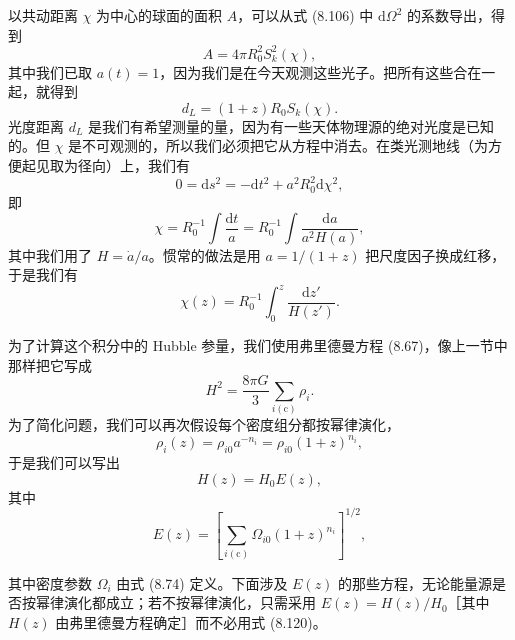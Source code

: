 以共动距离 $\chi$ 为中心的球面的面积 $A$，可以从式 (8.106) 中 $\mathrm{d}\Omega^{2}$ 的系数导出，得到
\begin{equation*}
A = 4\pi R_0^{2}S_k^{2}(\chi),
\tag{8.112}
\end{equation*}
其中我们已取 $a(t)=1$，因为我们是在今天观测这些光子。把所有这些合在一起，就得到
\begin{equation*}
d_L = (1+z)R_0S_k(\chi).
\tag{8.113}
\end{equation*}
光度距离 $d_L$ 是我们有希望测量的量，因为有一些天体物理源的绝对光度是已知的。但 $\chi$ 是不可观测的，所以我们必须把它从方程中消去。在类光测地线（为方便起见取为径向）上，我们有
\begin{equation*}
0 = \mathrm{d}s^{2} = -\mathrm{d}t^{2} + a^{2}R_0^{2}\mathrm{d}\chi^{2},
\tag{8.114}
\end{equation*}
即
\begin{equation*}
\chi = R_0^{-1}\int\frac{\mathrm{d}t}{a} = R_0^{-1}\int\frac{\mathrm{d}a}{a^{2}H(a)},
\tag{8.115}
\end{equation*}
其中我们用了 $H=\dot{a}/a$。惯常的做法是用 $a=1/(1+z)$ 把尺度因子换成红移，于是我们有
\begin{equation*}
\chi(z) = R_0^{-1}\int_{0}^{z}\frac{\mathrm{d}z'}{H(z')}.
\tag{8.116}
\end{equation*}

为了计算这个积分中的 Hubble 参量，我们使用弗里德曼方程 (8.67)，像上一节中那样把它写成
\begin{equation*}
H^{2} = \frac{8\pi G}{3}\sum_{i(\mathrm{c})}\rho_i.
\tag{8.117}
\end{equation*}
为了简化问题，我们可以再次假设每个密度组分都按幂律演化，
\begin{equation*}
\rho_i(z) = \rho_{i0}a^{-n_i} = \rho_{i0}(1+z)^{n_i},
\tag{8.118}
\end{equation*}
于是我们可以写出
\begin{equation*}
H(z) = H_0E(z),
\tag{8.119}
\end{equation*}
其中
\begin{equation*}
E(z) = \left[\sum_{i(\mathrm{c})}\Omega_{i0}(1+z)^{n_i}\right]^{1/2},
\tag{8.120}
\end{equation*}

其中密度参数 $\Omega_i$ 由式 (8.74) 定义。下面涉及 $E(z)$ 的那些方程，无论能量源是否按幂律演化都成立；若不按幂律演化，只需采用 $E(z)=H(z)/H_0$［其中 $H(z)$ 由弗里德曼方程确定］而不必用式 (8.120)。

